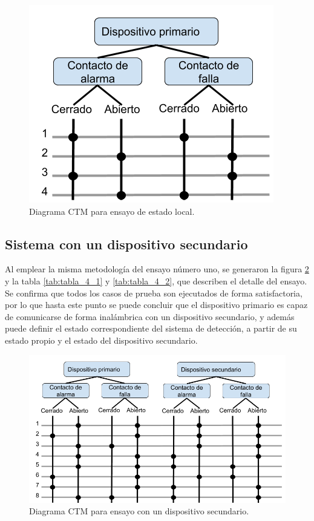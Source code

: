 \begin{figure}[ht]
	\centering
	\includegraphics[scale=.5]{./Figures/Capitulo4/Figura_J.png}
	\caption{Diagrama CTM para ensayo de estado local.}
	\label{fig:figura_j}
\end{figure}

\subsection{Sistema con un dispositivo secundario}

Al emplear la misma metodología del ensayo número uno, se generaron la figura \ref{fig:figura_k} y la tabla \ref{tab:tabla_4_1} y \ref{tab:tabla_4_2}, que describen el detalle del ensayo. Se confirma que todos los casos de prueba son ejecutados de forma satisfactoria, por lo que hasta este punto se puede concluir que el dispositivo primario es capaz de comunicarse de forma inalámbrica con un dispositivo secundario, y además puede definir el estado correspondiente del sistema de detección, a partir de su estado propio y el estado del dispositivo secundario. 

\begin{figure}[ht]
	\centering
	\includegraphics[scale=.45]{./Figures/Capitulo4/Figura_K.png}
	\caption{Diagrama CTM para ensayo con un dispositivo secundario.}
	\label{fig:figura_k}
\end{figure}


